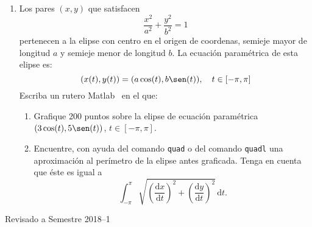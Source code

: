 \documentclass[letterpaper,11pt]{article}
\newcommand{\matlab}{{\sc Matlab} }
\begin{document}
\begin{enumerate}
\begin{enumerate}
\item Escriba una funcion en \matlab cuyas entradas sean $f$, el intervalo $[a,b]$ y $N$. Esta funci\'on debe dibujar en un mismo gr\'afico $f$ y la $N$-\'esima Suma Parcial de Fourier en el intervalo $[a,b]$.
\item Pruebe su funci\'on para distintos valores $N=1,2,5,10$ y las siguientes funciones:
\begin{enumerate}
  \item $\displaystyle h(x)=\left\{
  \begin{array}{cc}
    1 & \textrm{si } x\in[-2,0[ \\
     &  \\
    x^2 & \textrm{si } x\in[0,1]
  \end{array}
  \right.$
\end{enumerate} 
Observe que ocurre a medida que crecen los valores de $N$.
\item Modifique la funci\'on anterior para  que calcule la Suma Parcial de Fourier en el intervalo $[a,b]$, pero que grafique dicha suma en el intervalo $[a-L,b+L]$, con $L=b-a$. >Qu\'e se puede observar?
\end{enumerate}
\textbf{Sugerencia:} Es muy \'util el uso de \verb"@(x)" en el c\'alculo de las integrales, considando que se integra una funci\'on que depende de $a$, $b,$ $n$ y la variable $x$.

\item Los pares $(x,y)$ que satisfacen
$$\frac{x^2}{a^2}+\frac{y^2}{b^2}=1$$
pertenecen a la elipse con centro en el origen de coordenas, semieje mayor de longitud $a$ y semieje menor de longitud $b$. La ecuaci\'on param\'etrica de esta elipse es:
$$(x(t), y(t)) = (a \cos(t), b \sen(t)),\quad t \in [-\pi,\pi]$$
Escriba un rutero \matlab\, en el que:
\begin{enumerate}
\item Grafique 200 puntos sobre la elipse de ecuaci\'on param\'etrica $(3 \cos(t), 5 \sen(t))$,  $t \in [-\pi, \pi]$.
\item Encuentre, con ayuda del comando \verb+quad+ o del comando \verb+quadl+ una aproximaci\'on al
per\'imetro de la elipse antes graficada. Tenga en cuenta que \'este es igual a
$$\int_{-\pi}^{\pi}\sqrt{\left(\frac{\textrm{d}x}{\textrm{d}t}\right)^2+\left(\frac{\textrm{d}y}{\textrm{d}t}\right)^2}\,\mathrm{d}t.$$
\end{enumerate}
\end{enumerate}

\vfill
\hfill Revisado a Semestre 2018--1
\end{document}
